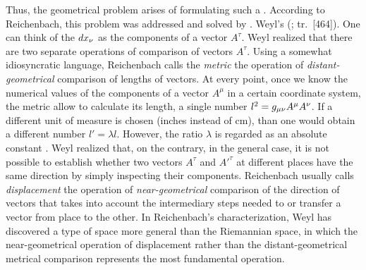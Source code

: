\documentclass[submitted]{article}
\renewcommand{\rzlap}[2]{(\cite[#1]{Reichenbach1928}; tr.\ [#2])\xspace}
\begin{document}
Thus, the geometrical problem arises of formulating such a . According to Reichenbach, this problem was addressed and solved by \citet{Weyl1918a,Weyl1918b}. Weyl's  \rzlap{333}{464}. One can think of the $dx_{\nu}$ as the components of a vector $A^\tau$. Weyl realized that there are two separate operations of comparison of vectors $A^\tau$. Using a somewhat idiosyncratic language, Reichenbach calls the \emph{metric} the operation of \emph{distant-geometrical} comparison of lengths of vectors. At every point, once we know the numerical values of the components of a vector $A^\mu$ in a certain coordinate system, the metric \gmn allow to calculate its length, a single number $l^2=g_{\mu\nu} A^\mu A^\nu$. If a different unit of measure is chosen (inches instead of cm), than one would obtain a different number $l'=\lambda l$. However, the ratio $\lambda$ is regarded as an absolute constant \citep[see][102]{Weyl1919a}. Weyl realized that, on the contrary, in the general case, it is not possible to establish whether two vectors $A^\tau$ and $A'^\tau$ at different places have the same direction by simply inspecting their components. Reichenbach usually calls \emph{displacement} the operation of \emph{near-geometrical} comparison of the direction of vectors that takes into account the intermediary steps needed to  or transfer a vector from place to the other. In Reichenbach's characterization, Weyl has discovered a type of space more general than the Riemannian space, in which the near-geometrical operation of displacement rather than the distant-geometrical metrical comparison represents the most fundamental operation. 
 

\end{document}
